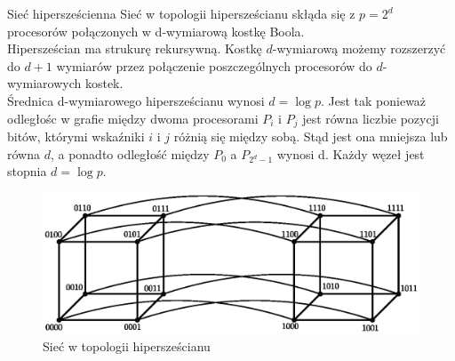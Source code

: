 \begin{przyklad}{Sieć hipersześcienna}
Sieć w topologii hipersześcianu skłąda się z \(p=2^d\) procesorów połączonych w d-wymiarową kostkę Boola.\\

Hipersześcian ma strukurę rekursywną. Kostkę \(d\)-wymiarową możemy rozszerzyć do \(d+1\) wymiarów przez połączenie poszczególnych procesorów do \(d\)-wymiarowych kostek.\\

Średnica d-wymiarowego hipersześcianu wynosi \(d=\log{p}\). Jest tak ponieważ odległośc w grafie między dwoma procesorami \(P_i\) i \(P_j\) jest równa liczbie pozycji bitów, którymi wskaźniki \(i\) i \(j\) różnią się między sobą. Stąd jest ona mniejsza lub równa \(d\), a ponadto odległość między \(P_0\) a \(P_{2^d-1}\) wynosi d. Każdy węzeł jest stopnia \(d=\log{p}\).
\end{przyklad}	
\begin{figure}[h]
\centering
\includegraphics[width=32em]{images/systolic.eps}
\caption{Sieć w topologii hipersześcianu}
\label{fig:systolic}
\end{figure}

